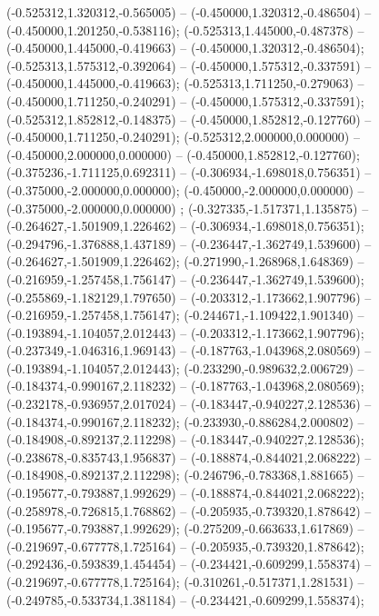  (-0.525312,1.320312,-0.565005) -- (-0.450000,1.320312,-0.486504) -- (-0.450000,1.201250,-0.538116);
 (-0.525313,1.445000,-0.487378) -- (-0.450000,1.445000,-0.419663) -- (-0.450000,1.320312,-0.486504);
 (-0.525313,1.575312,-0.392064) -- (-0.450000,1.575312,-0.337591) -- (-0.450000,1.445000,-0.419663);
 (-0.525313,1.711250,-0.279063) -- (-0.450000,1.711250,-0.240291) -- (-0.450000,1.575312,-0.337591);
 (-0.525312,1.852812,-0.148375) -- (-0.450000,1.852812,-0.127760) -- (-0.450000,1.711250,-0.240291);
 (-0.525312,2.000000,0.000000) -- (-0.450000,2.000000,0.000000) -- (-0.450000,1.852812,-0.127760);
 (-0.375236,-1.711125,0.692311) -- (-0.306934,-1.698018,0.756351) -- (-0.375000,-2.000000,0.000000);
 (-0.450000,-2.000000,0.000000) -- (-0.375000,-2.000000,0.000000) ;
 (-0.327335,-1.517371,1.135875) -- (-0.264627,-1.501909,1.226462) -- (-0.306934,-1.698018,0.756351);
 (-0.294796,-1.376888,1.437189) -- (-0.236447,-1.362749,1.539600) -- (-0.264627,-1.501909,1.226462);
 (-0.271990,-1.268968,1.648369) -- (-0.216959,-1.257458,1.756147) -- (-0.236447,-1.362749,1.539600);
 (-0.255869,-1.182129,1.797650) -- (-0.203312,-1.173662,1.907796) -- (-0.216959,-1.257458,1.756147);
 (-0.244671,-1.109422,1.901340) -- (-0.193894,-1.104057,2.012443) -- (-0.203312,-1.173662,1.907796);
 (-0.237349,-1.046316,1.969143) -- (-0.187763,-1.043968,2.080569) -- (-0.193894,-1.104057,2.012443);
 (-0.233290,-0.989632,2.006729) -- (-0.184374,-0.990167,2.118232) -- (-0.187763,-1.043968,2.080569);
 (-0.232178,-0.936957,2.017024) -- (-0.183447,-0.940227,2.128536) -- (-0.184374,-0.990167,2.118232);
 (-0.233930,-0.886284,2.000802) -- (-0.184908,-0.892137,2.112298) -- (-0.183447,-0.940227,2.128536);
 (-0.238678,-0.835743,1.956837) -- (-0.188874,-0.844021,2.068222) -- (-0.184908,-0.892137,2.112298);
 (-0.246796,-0.783368,1.881665) -- (-0.195677,-0.793887,1.992629) -- (-0.188874,-0.844021,2.068222);
 (-0.258978,-0.726815,1.768862) -- (-0.205935,-0.739320,1.878642) -- (-0.195677,-0.793887,1.992629);
 (-0.275209,-0.663633,1.617869) -- (-0.219697,-0.677778,1.725164) -- (-0.205935,-0.739320,1.878642);
 (-0.292436,-0.593839,1.454454) -- (-0.234421,-0.609299,1.558374) -- (-0.219697,-0.677778,1.725164);
 (-0.310261,-0.517371,1.281531) -- (-0.249785,-0.533734,1.381184) -- (-0.234421,-0.609299,1.558374);
